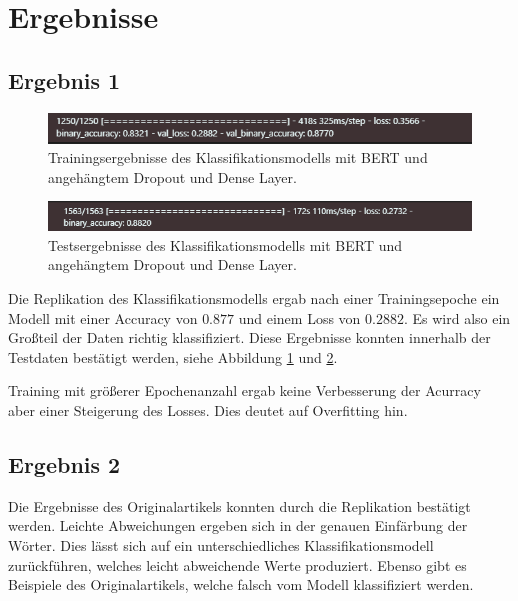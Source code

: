 \documentclass[DIV=13,fontsize=11pt]{scrartcl}
\begin{document}
\section{Ergebnisse}

\subsection{Ergebnis 1}

\begin{figure}[H]
    \centering
    \includegraphics[width=\linewidth]{img/train_time.png}
    \caption{Trainingsergebnisse des Klassifikationsmodells mit BERT und angehängtem Dropout und Dense Layer.}
    \label{fig:modell_train}
\end{figure}

\begin{figure}[H]
    \centering
    \includegraphics[width=\linewidth]{img/test_time.png}
    \caption{Testsergebnisse des Klassifikationsmodells mit BERT und angehängtem Dropout und Dense Layer.}
    \label{fig:modell_test}
\end{figure}

Die Replikation des Klassifikationsmodells ergab nach einer Trainingsepoche ein Modell mit einer Accuracy von $0.877$ und
einem Loss von $0.2882$. Es wird also ein Großteil der Daten richtig klassifiziert. Diese Ergebnisse konnten innerhalb
der Testdaten bestätigt werden, siehe Abbildung \ref{fig:modell_train} und \ref{fig:modell_test}.

Training mit größerer Epochenanzahl ergab keine Verbesserung der Acurracy aber einer Steigerung des Losses. Dies
deutet auf Overfitting hin.

\subsection{Ergebnis 2}

Die Ergebnisse des Originalartikels konnten durch die Replikation bestätigt werden. Leichte Abweichungen
ergeben sich in der genauen Einfärbung der Wörter. Dies lässt sich auf ein unterschiedliches Klassifikationsmodell
zurückführen, welches leicht abweichende Werte produziert. Ebenso gibt es Beispiele des Originalartikels, welche
falsch vom Modell klassifiziert werden.\\
\end{document}
